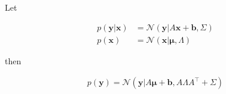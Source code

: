 \begin{lemma}

    Let

    \begin{align}
        p(\mathbf{y}|\mathbf{x})&=\mathcal{N}(\mathbf{y}|A\mathbf{x}+\mathbf{b},\Sigma)\label{eq:pyGx}\\
        p(\mathbf{x})&=\mathcal{N}(\mathbf{x}|\boldsymbol{\mu},\Lambda)\label{eq:px}
    \end{align}

    \noindent then

    \begin{align}
        p(\mathbf{y})=\mathcal{N}(\mathbf{y}|A\boldsymbol{\mu}+\mathbf{b},A\Lambda A^\intercal+\Sigma)\label{eq:py}
    \end{align}

\end{lemma}

